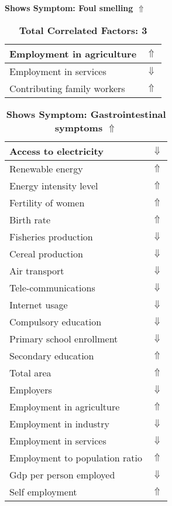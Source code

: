 \documentclass[12pt,notitlepage,oneside]{report}
\begin{document}
\begin{table}[!htb]
\caption{\textbf{Shows Symptom: Foul smelling $\Uparrow$}}
\centering
\label{Correlated Socio-economic Factors0}
\begin{tabular}{|l|l|}
\hline
Employment in agriculture & $\Uparrow$\\ \hline
Employment in services & $\Downarrow$\\ \hline
Contributing family workers & $\Uparrow$\\ \hline
\end{tabular}
\caption*{\textbf{Total Correlated Factors: 3}}
\end{table}
\begin{table}[!htb]
\caption{\textbf{Shows Symptom: Gastrointestinal symptoms $\Uparrow$}}
\centering
\label{Correlated Socio-economic Factors0}
\begin{tabular}{|l|l|}
\hline
Access to electricity & $\Downarrow$\\ \hline
Renewable energy & $\Uparrow$\\ \hline
Energy intensity level & $\Uparrow$\\ \hline
Fertility of women & $\Uparrow$\\ \hline
Birth rate & $\Uparrow$\\ \hline
Fisheries production & $\Downarrow$\\ \hline
Cereal production & $\Downarrow$\\ \hline
Air transport  & $\Downarrow$\\ \hline
Tele-communications & $\Downarrow$\\ \hline
Internet usage & $\Downarrow$\\ \hline
Compulsory education & $\Downarrow$\\ \hline
Primary school enrollment & $\Downarrow$\\ \hline
Secondary education & $\Uparrow$\\ \hline
Total area & $\Uparrow$\\ \hline
Employers & $\Downarrow$\\ \hline
Employment in agriculture & $\Uparrow$\\ \hline
Employment in industry & $\Downarrow$\\ \hline
Employment in services & $\Downarrow$\\ \hline
Employment to population ratio & $\Uparrow$\\ \hline
Gdp per person employed & $\Downarrow$\\ \hline
Self employment & $\Uparrow$\\ \hline

\end{tabular}
\end{table}
\end{document}
